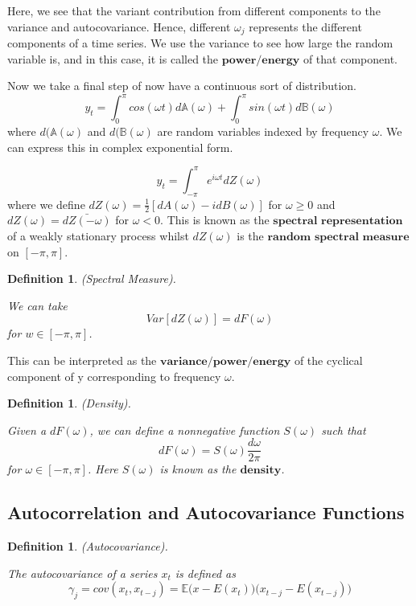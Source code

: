 \documentclass[twoside]{article}
\newtheorem{definition}[theorem]{Definition}
\begin{document}
Here, we see that the variant contribution from different components to the variance and autocovariance. Hence, different $\omega_j$ represents the different components of a time series. We use the variance to see how large the random variable is, and in this case, it is called the $\textbf{power/energy}$ of that component. 

\bigskip
Now we take a final step of now have a continuous sort of distribution.
$$
y_t = \int_0^{\pi}cos(\omega t)d\mathbb{A}(\omega) + \int_0^{\pi}sin(\omega t)d\mathbb{B}(\omega)
$$
where $d(\mathbb{A}(\omega)$ and $d(\mathbb{B}(\omega)$ are random variables indexed by frequency $\omega$. We can express this in complex exponential form.

$$
y_t = \int_{- \pi}^{\pi}e^{i\omega t}dZ(\omega)
$$
where we define $dZ(\omega) = \frac{1}{2}[dA(\omega) - idB(\omega)]$ for $\omega \geq 0$ and $dZ(\omega) = \bar{dZ(-\omega)}$ for $\omega < 0$. This is known as the $\textbf{spectral representation}$ of a weakly stationary process whilst $dZ(\omega)$ is the $\textbf{random spectral measure}$ on $[-\pi, \pi]$.

\begin{definition}(Spectral Measure).

We can take 
$$
Var[dZ(\omega)] = dF(\omega)
$$
for $w \in [-\pi, \pi]$.
\end{definition}
This can be interpreted as the $\textbf{variance/power/energy}$ of the cyclical component of y corresponding to frequency $\omega$.

\begin{definition}(Density).

Given a $dF(\omega)$, we can define a nonnegative function $S(\omega)$ such that
$$
dF(\omega) = S(\omega)\frac{d\omega}{2\pi}
$$
for $\omega \in [-\pi, \pi]$. Here $S(\omega)$ is known as the $\textbf{density}$.
\end{definition}


\subsection{Autocorrelation and Autocovariance Functions}
\begin{definition}(Autocovariance).

The autocovariance of a series $x_t$ is defined as
$$\gamma_j = cov(x_t, x_{t-j}) = \mathbb{E}\big(x - E(x_t)\big)\big(x_{t-j} - E(x_{t-j})\big)$$

\end{definition}
\end{document}
